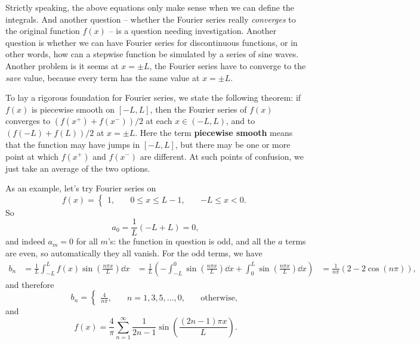 \documentclass[hyperref, a4paper]{article}
\newcommand*{\concept}[1]{{\textbf{#1}}}
\def\\{}%
\begin{document}
Strictly speaking, 
the above equations only make sense when we can define the integrals. 
And another question 
-- whether the Fourier series really \emph{converges} to the original function $f(x)$ -- 
is a question needing investigation.
Another question is whether we can have Fourier series for discontinuous functions, 
or in other words, 
how can a stepwise function be simulated by a series of sine waves. 
Another problem is it seems at $x = \pm L$,
the Fourier series have to converge to the \emph{save} value,
because every term has the same value at $x = \pm L$.

To lay a rigorous foundation for Fourier series, 
we state the following theorem:
if $f(x)$ is piecewise smooth on $[-L, L]$, 
then the Fourier series of $f(x)$ converges to 
$(f(x^+) + f(x^-)) / 2$ at each $x \in (-L, L)$, 
and to $(f(-L) + f(L)) / 2$ at $x = \pm L$. 
Here the term \concept{piecewise smooth} means 
that the function may have jumps in $[-L, L]$, 
but there may be one or more point 
at which $f(x^+)$ and $f(x^-)$ are different. 
At such points of confusion, 
we just take an average of the two options. 

As an example, let's try Fourier series on 
\begin{equation}
    f(x) = \begin{cases}
        1, \quad & 0 \leq x \leq L \\
        -1, \quad & - L \leq x < 0.
    \end{cases}
\end{equation}
So 
\[
    a_0 = \frac{1}{L} (-L + L) = 0,
\] 
and indeed $a_m = 0$ for all $m$'s: 
the function in question is odd, 
and all the $a$ terms are even,
so automatically they all vanish. 
For the odd terms, we have 
\[
    \begin{aligned}
        b_n &= \frac{1}{L} \int_{-L}^{L} f(x) \sin(\frac{n \pi x}{L}) \dd{x} \\
        &= \frac{1}{L} \left(
            - \int_{-L}^{0} \sin(\frac{n \pi x}{L}) \dd{x} 
            + \int_{0}^{L} \sin(\frac{n \pi x}{L}) \dd{x} 
        \right) \\
        &= \frac{1}{n \pi} (2 - 2 \cos (n \pi)),
    \end{aligned}
\]
and therefore 
\begin{equation}
    b_n = \begin{cases}
        \frac{4}{n \pi} , &\quad n = 1, 3, 5, \dots,\\
        0, &\quad \text{otherwise},
    \end{cases}
\end{equation}
and 
\begin{equation}
    f(x) = \frac{4}{\pi} \sum_{n=1}^{\infty} \frac{1}{2n-1} \sin(\frac{(2n-1) \pi x}{L}).
\end{equation}
\end{document}
